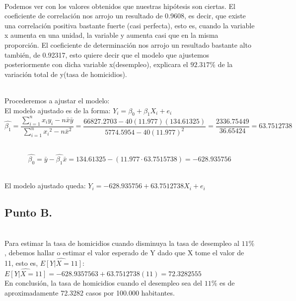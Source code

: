 \documentclass[letterpaper,12pt,onecolumn,titlepage]{article}
\begin{document}
~\\ Podemos ver con los valores obtenidos que nuestras hip\'{o}tesis son ciertas. El coeficiente de correlaci\'{o}n nos arrojo un resultado de 0.9608, es decir, que existe una correlaci\'{o}n positiva bastante fuerte (casi perfecta), esto es, cuando la variable x aumenta en una unidad, la variable y aumenta casi que en la misma proporci\'{o}n. El coeficiente de determinaci\'{o}n nos arrojo un resultado bastante alto tambi\'{e}n, de 0.92317, esto quiere decir que el modelo que ajustemos posteriormente con dicha variable x(desempleo), explicara el $92.317\%$ de la variaci\'{o}n total de y(tasa de homicidios).

~\\ Procederemos a ajustar el modelo:
~\\ El modelo ajustado es de la forma: $Y_{i}=\beta_{0}+\beta_{1}X_{i}+e_{i}$
~\\ $$\hat{\beta_{1}}=\frac{\sum\limits_{i=1}^{n}x_{i}y_{i}-n\bar{x}\bar{y}}{\sum\limits_{i=1}^{n}{x_{i}}^2 - n\bar{x}^2}=\frac{66827.2703-40(11.977)(134.61325)}{5774.5954-40(11.977)^2}=\frac{2336.75449}{36.65424}=63.7512738$$

~\\ $$\hat{\beta_{0}}=\bar{y}-\hat{\beta_{1}}\bar{x}=134.61325-(11.977\cdot 63.7515738)=-628.935756$$

~\\ El modelo ajustado queda: $Y_{i}=-628.935756+63.7512738X_{i}+ e_{i}$
\subsection{Punto B.}
~\\ Para estimar la tasa de homicidios cuando disminuya la tasa de desempleo al $11\%$, debemos hallar o estimar el valor esperado de Y dado que X tome el valor de 11, esto es, $\hat{E[Y|X=11]}$:
~\\ $\hat{E[Y|X=11]}=-628.9357563+63.7512738(11)=72.3282555$
~\\ En conclusi\'{o}n, la tasa de homicidios cuando el desempleo sea del $11\%$ es de aproximadamente 72.3282 casos por 100.000 habitantes. 
\end{document}
